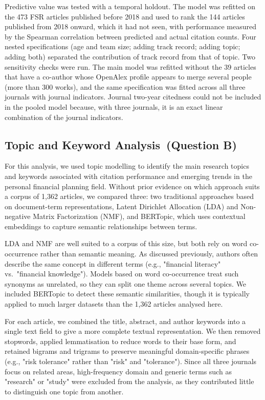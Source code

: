 \documentclass[11pt,a4paper]{article}
\begin{document}
Predictive value was tested with a temporal holdout. The model was refitted on the 473 FSR articles published before 2018 and used to rank the 144 articles published from 2018 onward, which it had not seen, with performance measured by the Spearman correlation between predicted and actual citation counts. Four nested specifications (age and team size; adding track record; adding topic; adding both) separated the contribution of track record from that of topic. Two sensitivity checks were run. The main model was refitted without the 39 articles that have a co-author whose OpenAlex profile appears to merge several people (more than 300 works), and the same specification was fitted across all three journals with journal indicators. Journal two-year citedness could not be included in the pooled model because, with three journals, it is an exact linear combination of the journal indicators.

\subsection{Topic and Keyword Analysis~(Question B)}\label{topic-and-keyword-analysis-question-b}

For this analysis, we used topic modelling to identify the main research topics and keywords associated with citation performance and emerging trends in the personal financial planning field. Without prior evidence on which approach suits a corpus of 1,362 articles, we compared three: two traditional approaches based on document-term representations, Latent Dirichlet Allocation (LDA) and Non-negative Matrix Factorization (NMF), and BERTopic, which uses contextual embeddings to capture semantic relationships between terms.

LDA and NMF are well suited to a corpus of this size, but both rely on word co-occurrence rather than semantic meaning. As discussed previously, authors often describe the same concept in different terms (e.g., "financial literacy" vs.~"financial knowledge"). Models based on word co-occurrence treat such synonyms as unrelated, so they can split one theme across several topics. We included BERTopic to detect these semantic similarities, though it is typically applied to much larger datasets than the 1,362 articles analysed here.

For each article, we combined the title, abstract, and author keywords into a single text field to give a more complete textual representation. We then removed stopwords, applied lemmatisation to reduce words to their base form, and retained bigrams and trigrams to preserve meaningful domain-specific phrases (e.g., "risk tolerance" rather than "risk" and "tolerance"). Since all three journals focus on related areas, high-frequency domain and generic terms such as "research" or "study" were excluded from the analysis, as they contributed little to distinguish one topic from another.
\end{document}
